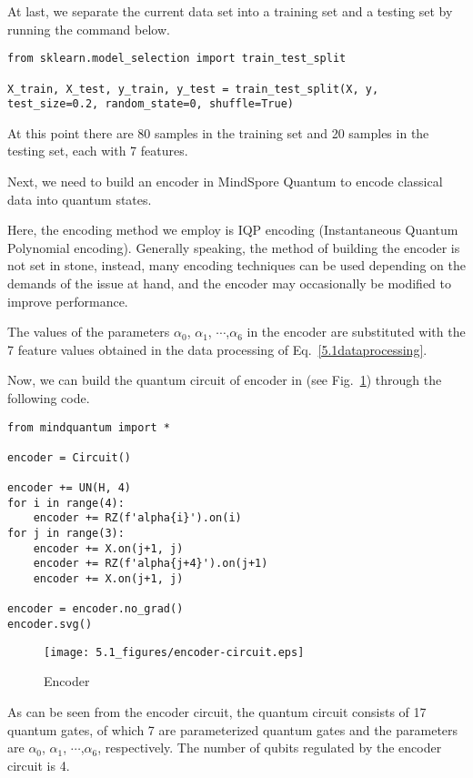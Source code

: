 At last, we separate the current data set into a training set and a testing set by running the command below.

\begin{lstlisting}
from sklearn.model_selection import train_test_split

X_train, X_test, y_train, y_test = train_test_split(X, y, test_size=0.2, random_state=0, shuffle=True)
\end{lstlisting}

At this point there are 80 samples in the training set and 20 samples in the testing set, each with 7 features.

Next, we need to build an encoder in MindSpore Quantum to encode classical data into quantum states.

Here, the encoding method we employ is IQP encoding (Instantaneous Quantum Polynomial encoding). Generally speaking, the method of building the encoder is not set in stone, instead, many encoding techniques can be used depending on the demands of the issue at hand, and the encoder may occasionally be modified to improve performance.

The values of the parameters $\alpha_0$, $\alpha_1$, $\cdots$,$\alpha_6$ in the encoder are substituted with the 7 feature values obtained in the data processing of Eq.~\eqref{5.1dataprocessing}.

Now, we can build the quantum circuit of encoder in \MindQuantum (see Fig.~\ref{5.1encoder-circuit}) through the following code.

\begin{lstlisting}
from mindquantum import *

encoder = Circuit()

encoder += UN(H, 4)
for i in range(4):
    encoder += RZ(f'alpha{i}').on(i)
for j in range(3):
    encoder += X.on(j+1, j)
    encoder += RZ(f'alpha{j+4}').on(j+1)
    encoder += X.on(j+1, j)

encoder = encoder.no_grad()
encoder.svg()
\end{lstlisting}

\begin{figure}[H]
    \centering
    \texttt{[image: 5.1\_figures/encoder-circuit.eps]}
    \caption{Encoder}
    \label{5.1encoder-circuit}
\end{figure}

As can be seen from the encoder circuit, the quantum circuit consists of 17 quantum gates, of which 7 are
parameterized quantum gates and the parameters are $\alpha_0$, $\alpha_1$, $\cdots$,$\alpha_6$, respectively. The number of qubits regulated by the encoder circuit is 4.

